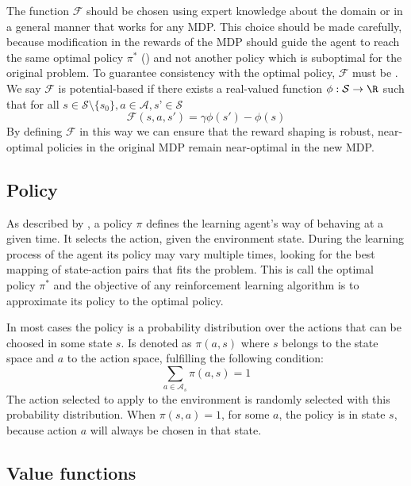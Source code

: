 The function $\mathcal{F}$ should be chosen using expert knowledge about the domain or in a general manner that works for any MDP. This choice should be made carefully, because modification in the rewards of the MDP should guide the agent to reach the same optimal policy $\pi^*$ () and not another policy which is suboptimal for the original problem. To guarantee consistency with the optimal policy, $\mathcal{F}$ must be . We say $\mathcal{F}$ is potential-based if there exists a real-valued function
$\phi : \mathcal{S} \rightarrow \R$ such that for all $s \in \mathcal{S} \setminus \{s_0\} , a \in \mathcal{A}, s’ \in \mathcal{S}$
\begin{equation}
    \mathcal{F}(s, a, s') = \gamma \phi(s') - \phi(s)
\end{equation}
By defining $\mathcal{F}$ in this way we can ensure that the reward shaping is robust, near-optimal policies in the original \ac{MDP} remain near-optimal in the new \ac{MDP}.

\subsection{Policy\label{subsec:policy}}

As described by \citeauthor*[Section~1.3]{sutton1998introduction}, a policy $\pi$ defines the learning agent’s way of behaving at a given time. It selects the action, given the environment state. During the learning process of the agent its policy may vary multiple times, looking for the best mapping of state-action pairs that fits the problem. This is call the optimal policy $\pi^*$ and the objective of any reinforcement learning algorithm is to approximate its policy to the optimal policy.

In most cases the policy is a probability distribution over the actions that can be choosed in some state $s$. Is denoted as $\pi(a,s)$ where $s$ belongs to the state space and $a$ to the action space, fulfilling the following condition:
\begin{equation}
    \sum_{a \in \mathcal{A}_s} \pi(a,s) = 1
\end{equation}
The action selected to apply to the environment is randomly selected with this probability distribution. When $\pi(s,a)=1$, for some $a$, the policy is  in state $s$, because action $a$ will always be chosen in that state.

\subsection{Value functions}


